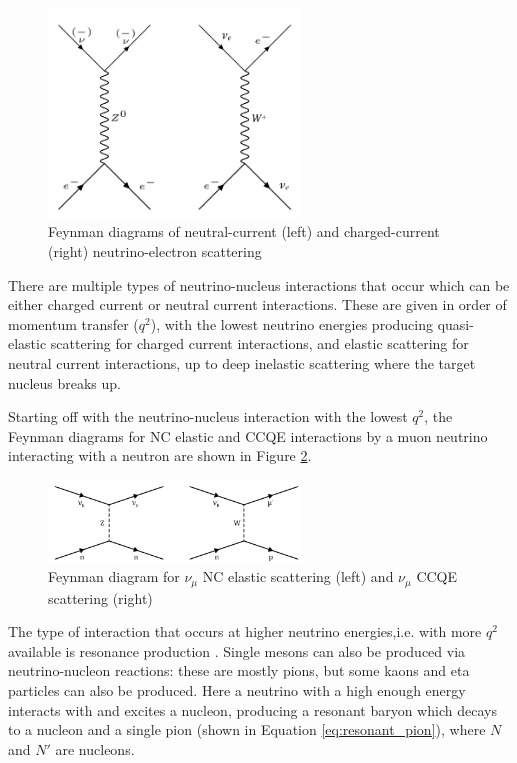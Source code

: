 \begin{figure}
    \centering
    \includegraphics[width=0.6\textwidth]{Figures/elastic_scattering.png}
    \caption{Feynman diagrams of neutral-current (left) and charged-current (right) neutrino-electron scattering}
    \label{fig:elastic_scattering}
\end{figure}

There are multiple types of neutrino-nucleus interactions that occur which can be either charged current or neutral current interactions. These are given in order of momentum transfer ($q^2$), with the lowest neutrino energies producing quasi-elastic scattering for charged current interactions, and elastic scattering for neutral current interactions, up to deep inelastic scattering where the target nucleus breaks up. 

Starting off with the neutrino-nucleus interaction with the lowest $q^2$, the Feynman diagrams for NC elastic and CCQE interactions by a muon neutrino interacting with a neutron are shown in Figure \ref{fig:ncel_ccqe}. 

\begin{figure}
    \centering
    \includegraphics[width=0.6\textwidth]{Figures/ncel_ccqe.png}
    \caption{Feynman diagram for $\nu_{\mu}$ NC elastic scattering (left) and $\nu_{\mu}$ CCQE scattering (right)}
    \label{fig:ncel_ccqe}
\end{figure}

The type of interaction that occurs at higher neutrino energies,i.e. with more $q^2$ available is resonance production \cite{PhysRevD.69.014013}. Single mesons can also be produced via neutrino-nucleon reactions: these are mostly pions, but some kaons and eta particles can also be produced. Here a neutrino with a high enough energy interacts with and excites a nucleon, producing a resonant baryon which decays to a nucleon and a single pion (shown in Equation \ref{eq:resonant_pion}), where $N$ and $N'$ are nucleons.


